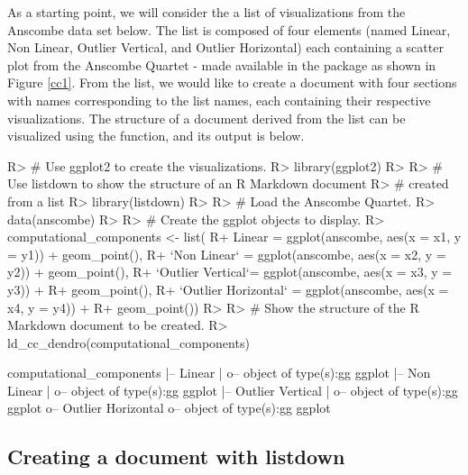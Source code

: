 \documentclass[
]{jss}
\begin{document}
As a starting point, we will consider the a list of visualizations from
the Anscombe data set below. The list is composed of four 
\citep{wickham2016} elements (named Linear, Non Linear, Outlier
Vertical, and Outlier Horizontal) each containing a scatter plot from
the Anscombe Quartet - made available in the  package
\citep{R} as shown in Figure \ref{cc1}. From the
 list, we would like to create a document
with four sections with names corresponding to the list names, each
containing their respective visualizations. The structure of a document
derived from the  list can be visualized
using the  function, and its output is below.

\begin{CodeChunk}

\begin{CodeInput}
R> # Use ggplot2 to create the visualizations.
R> library(ggplot2)
R> 
R> # Use listdown to show the structure of an R Markdown document
R> # created from a list
R> library(listdown)
R> 
R> # Load the Anscombe Quartet.
R> data(anscombe)
R> 
R> # Create the ggplot objects to display.
R>   computational_components <- list(
R+     Linear = ggplot(anscombe, aes(x = x1, y = y1)) + geom_point(),
R+     `Non Linear` = ggplot(anscombe, aes(x = x2, y = y2)) + geom_point(),
R+     `Outlier Vertical`= ggplot(anscombe, aes(x = x3, y = y3)) + 
R+       geom_point(),
R+     `Outlier Horizontal` =  ggplot(anscombe, aes(x = x4, y = y4)) + 
R+       geom_point())
R> 
R> # Show the structure of the R Markdown document to be created.
R> ld_cc_dendro(computational_components)
\end{CodeInput}

\begin{CodeOutput}

computational_components
  |-- Linear
  |  o-- object of type(s):gg ggplot
  |-- Non Linear
  |  o-- object of type(s):gg ggplot
  |-- Outlier Vertical
  |  o-- object of type(s):gg ggplot
  o-- Outlier Horizontal
     o-- object of type(s):gg ggplot
\end{CodeOutput}
\end{CodeChunk}

\hypertarget{creating-a-document-with-listdown}{%
\subsection{Creating a document with
listdown}\label{creating-a-document-with-listdown}}
\end{document}
